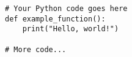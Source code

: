 \documentclass{article}
\begin{document}
\begin{lstlisting}
# Your Python code goes here
def example_function():
    print("Hello, world!")

# More code...
\end{lstlisting}
\end{document}
